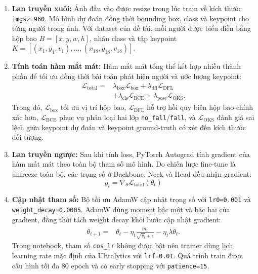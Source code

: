 \documentclass[12pt, a4paper]{article}
\begin{document}
\begin{enumerate}
    \item \textbf{Lan truyền xuôi:} Ảnh đầu vào được resize trong lúc train về kích thước \texttt{imgsz=960}. Mô hình dự đoán đồng thời bounding box, class và keypoint cho từng người trong ảnh. Với dataset của đề tài, mỗi người được biểu diễn bằng hộp bao $B = [x, y, w, h]$, nhãn class và tập keypoint $K = [(x_1, y_1, v_1), \dots, (x_{18}, y_{18}, v_{18})]$.
    \item \textbf{Tính toán hàm mất mát:} Hàm mất mát tổng thể kết hợp nhiều thành phần để tối ưu đồng thời bài toán phát hiện người và ước lượng keypoint:
    \begin{equation}
    \begin{aligned}
        \mathcal{L}_{\text{total}} ={}&
        \lambda_{\text{box}} \mathcal{L}_{\text{box}}
        + \lambda_{\text{dfl}} \mathcal{L}_{\text{DFL}} \\
        &+ \lambda_{\text{cls}} \mathcal{L}_{\text{BCE}}
        + \lambda_{\text{pose}} \mathcal{L}_{\text{OKS}} .
    \end{aligned}
    \label{eq:training_total_loss}
    \end{equation}
    Trong đó, $\mathcal{L}_{\text{box}}$ tối ưu vị trí hộp bao, $\mathcal{L}_{\text{DFL}}$ hỗ trợ hồi quy biên hộp bao chính xác hơn, $\mathcal{L}_{\text{BCE}}$ phục vụ phân loại hai lớp \texttt{no\_fall}/\texttt{fall}, và $\mathcal{L}_{\text{OKS}}$ đánh giá sai lệch giữa keypoint dự đoán và keypoint ground-truth có xét đến kích thước đối tượng.
    \item \textbf{Lan truyền ngược:} Sau khi tính loss, PyTorch Autograd tính gradient của hàm mất mát theo toàn bộ tham số mô hình. Do chiến lược fine-tune là unfreeze toàn bộ, các trọng số ở Backbone, Neck và Head đều nhận gradient:
    \begin{equation}
        g_t = \nabla_\theta \mathcal{L}_{\text{total}}(\theta_t)
    \end{equation}
    \item \textbf{Cập nhật tham số:} Bộ tối ưu AdamW cập nhật trọng số với \texttt{lr0=0.001} và \texttt{weight\_decay=0.0005}. AdamW dùng moment bậc một và bậc hai của gradient, đồng thời tách weight decay khỏi bước cập nhật gradient:
    \begin{equation}
    \begin{aligned}
        \theta_{t+1} ={}& \theta_t
        - \eta_t \frac{\hat{m}_t}{\sqrt{\hat{v}_t} + \epsilon}
        - \eta_t \lambda \theta_t .
    \end{aligned}
    \end{equation}
    Trong notebook, tham số \texttt{cos\_lr} không được bật nên trainer dùng lịch learning rate mặc định của Ultralytics với \texttt{lrf=0.01}. Quá trình train được cấu hình tối đa 80 epoch và có early stopping với \texttt{patience=15}.
\end{enumerate}
\end{document}
